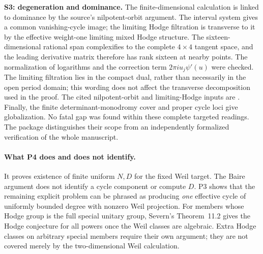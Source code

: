 \textbf{S3: degeneration and dominance.}
The finite-dimensional calculation is linked to dominance by the source's nilpotent-orbit argument. The interval system gives a common vanishing-cycle image; the limiting Hodge filtration is transverse to it by the effective weight-one limiting mixed Hodge structure. The sixteen-dimensional rational span complexifies to the complete $4\times4$ tangent space, and the leading derivative matrix therefore has rank sixteen at nearby points. The normalization of logarithms and the correction term $2\pi i u_j\psi'(u)$ were checked. The limiting filtration lies in the compact dual, rather than necessarily in the open period domain; this wording does not affect the transverse decomposition used in the proof. The cited nilpotent-orbit and limiting-Hodge inputs are \citet[Theorems~4.12 and 6.16, printed pp.~233 and 255]{Schmid73}. Finally, the finite determinant-monodromy cover and proper cycle loci give globalization. No fatal gap was found within these complete targeted readings. The package distinguishes their scope from an independently formalized verification of the whole manuscript.

\paragraph{What P4 does and does not identify.}
It proves existence of finite uniform $N,D$ for the fixed Weil target. The Baire argument does not identify a cycle component or compute $D$. P3 shows that the remaining explicit problem can be phrased as producing \emph{one} effective cycle of uniformly bounded degree with nonzero Weil projection. For members whose Hodge group is the full special unitary group, Severn's Theorem~11.2 gives the Hodge conjecture for all powers once the Weil classes are algebraic. Extra Hodge classes on arbitrary special members require their own argument; they are not covered merely by the two-dimensional Weil calculation.

